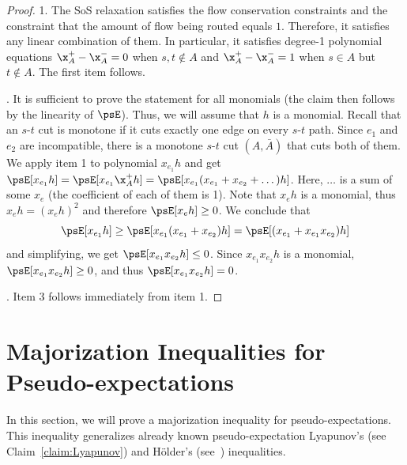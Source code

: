 \documentclass[11pt,a4paper]{article}
\begin{document}
\begin{proof}
1. The SoS relaxation satisfies the flow conservation constraints and the constraint that the amount of flow being routed equals $1$. Therefore, it satisfies any linear combination of them. In particular, it satisfies degree-1 polynomial equations $\x^{+}_A - \x^{-}_A = 0$ when $s,t\notin A$ and $\x^{+}_A - \x^{-}_A = 1$ when $s\in A$ but $t\notin A$. The first item follows.

. 
It is sufficient to prove the statement for all monomials (the claim then follows by the linearity of $\psE$). Thus, we will assume that $h$ is a monomial.
Recall that an $s$-$t$ cut is monotone if it cuts exactly one edge on every $s$-$t$ path. Since $e_1$ and $e_2$ are incompatible, there is a monotone $s$-$t$ cut $(A,\bar A)$ that cuts both of them. We apply item 1 to polynomial $x_{e_1} h$ and get
$\psE[x_{e_1} h] = \psE[x_{e_1} \x^+_A h] = \psE[x_{e_1} (x_{e_1} + x_{e_2} + \dots) h]$. Here, $\dots$ is a sum of some $x_e$ (the coefficient of each of them is 1). Note that $x_e h$ is a monomial, thus $x_e h = (x_e h)^2$ and therefore $\psE[x_eh] \geq 0$. We conclude that 
$$\psE[x_{e_1} h] \geq \psE[x_{e_1} (x_{e_1} + x_{e_2}) h] = 
\psE[(x_{e_1} + x_{e_1}x_{e_2}) h]$$ and simplifying, we get \(\psE[x_{e_1}x_{e_2}h] \leq 0\).
Since $x_{e_1}x_{e_2}h$ is a monomial, $\psE[x_{e_1}x_{e_2}h]\geq 0$, and thus $\psE[x_{e_1}x_{e_2}h] = 0$.

. Item 3 follows immediately from item 1.
\end{proof}



\section{Majorization Inequalities for Pseudo-expectations}\label{sec:majorization-inequalities}
In this section, we will prove a majorization inequality for pseudo-expectations. This inequality generalizes already known pseudo-expectation Lyapunov's (see Claim~\ref{claim:Lyapunov}) and H\"older's (see~\cite{BKS14}) inequalities. 
\end{document}
